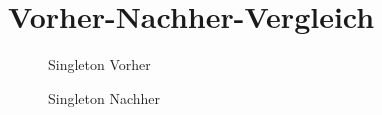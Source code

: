 \section{Vorher-Nachher-Vergleich}
\begin{figure}[htbp]
    \centering
    \caption{\label{singletonVorher} Singleton Vorher}
\end{figure}
\begin{figure}[htbp]
    \centering
    \caption{\label{singletonNachher} Singleton Nachher}
\end{figure}

